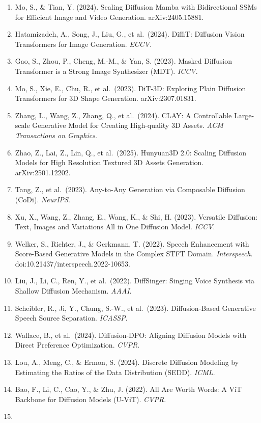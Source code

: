 \begin{enumerate}
\item
  Mo, S., \& Tian, Y. (2024). Scaling Diffusion Mamba with Bidirectional SSMs for Efficient Image and Video Generation. arXiv:2405.15881.
\item
  Hatamizadeh, A., Song, J., Liu, G., et al.~(2024). DiffiT: Diffusion Vision Transformers for Image Generation. \emph{ECCV}.
\item
  Gao, S., Zhou, P., Cheng, M.-M., \& Yan, S. (2023). Masked Diffusion Transformer is a Strong Image Synthesizer (MDT). \emph{ICCV}.
\item
  Mo, S., Xie, E., Chu, R., et al.~(2023). DiT-3D: Exploring Plain Diffusion Transformers for 3D Shape Generation. arXiv:2307.01831.
\item
  Zhang, L., Wang, Z., Zhang, Q., et al.~(2024). CLAY: A Controllable Large-scale Generative Model for Creating High-quality 3D Assets. \emph{ACM Transactions on Graphics}.
\item
  Zhao, Z., Lai, Z., Lin, Q., et al.~(2025). Hunyuan3D 2.0: Scaling Diffusion Models for High Resolution Textured 3D Assets Generation. arXiv:2501.12202.
\item
  Tang, Z., et al.~(2023). Any-to-Any Generation via Composable Diffusion (CoDi). \emph{NeurIPS}.
\item
  Xu, X., Wang, Z., Zhang, E., Wang, K., \& Shi, H. (2023). Versatile Diffusion: Text, Images and Variations All in One Diffusion Model. \emph{ICCV}.
\item
  Welker, S., Richter, J., \& Gerkmann, T. (2022). Speech Enhancement with Score-Based Generative Models in the Complex STFT Domain. \emph{Interspeech}. doi:10.21437/interspeech.2022-10653.
\item
  Liu, J., Li, C., Ren, Y., et al.~(2022). DiffSinger: Singing Voice Synthesis via Shallow Diffusion Mechanism. \emph{AAAI}.
\item
  Scheibler, R., Ji, Y., Chung, S.-W., et al.~(2023). Diffusion-Based Generative Speech Source Separation. \emph{ICASSP}.
\item
  Wallace, B., et al.~(2024). Diffusion-DPO: Aligning Diffusion Models with Direct Preference Optimization. \emph{CVPR}.
\item
  Lou, A., Meng, C., \& Ermon, S. (2024). Discrete Diffusion Modeling by Estimating the Ratios of the Data Distribution (SEDD). \emph{ICML}.
\item
  Bao, F., Li, C., Cao, Y., \& Zhu, J. (2022). All Are Worth Words: A ViT Backbone for Diffusion Models (U-ViT). \emph{CVPR}.
\item

\end{enumerate}
